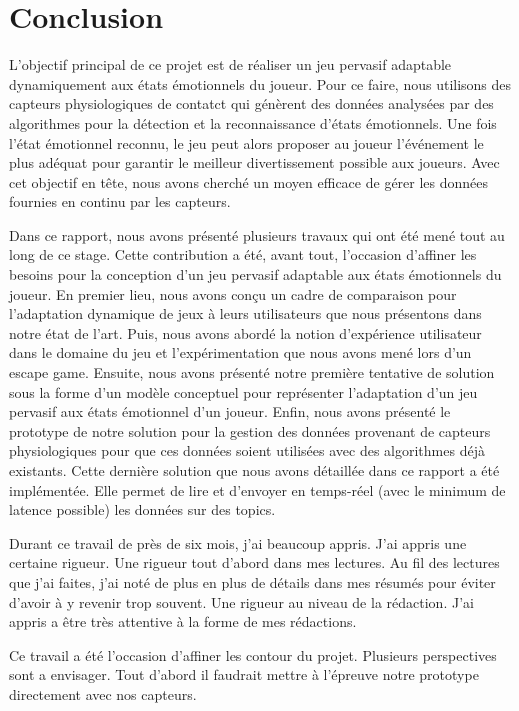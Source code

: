 \documentclass{article}
\begin{document}
\section{Conclusion}\label{sec:conclusion}
	L'objectif principal de ce projet est de réaliser un jeu pervasif adaptable dynamiquement aux états émotionnels du joueur. 
	Pour ce faire, nous utilisons des capteurs physiologiques de contatct qui génèrent des données analysées par des algorithmes pour la détection et la reconnaissance d'états émotionnels.
	Une fois l'état émotionnel reconnu, le jeu peut alors proposer au joueur l'événement le plus adéquat pour garantir le meilleur divertissement possible aux joueurs.
	Avec cet objectif en tête, nous avons cherché un moyen efficace de gérer les données fournies en continu par les capteurs.\par
	Dans ce rapport, nous avons présenté plusieurs travaux qui ont été mené tout au long de ce stage. 
	Cette contribution a été, avant tout, l'occasion d'affiner les besoins pour la conception d'un jeu pervasif adaptable aux états émotionnels du joueur.
	En premier lieu, nous avons conçu un cadre de comparaison pour l'adaptation dynamique de jeux à leurs utilisateurs que nous présentons dans notre état de l'art.
	Puis, nous avons abordé la notion d'expérience utilisateur dans le domaine du jeu et l'expérimentation que nous avons mené lors d'un escape game.
	Ensuite, nous avons présenté notre première tentative de solution sous la forme d'un modèle conceptuel pour représenter l'adaptation d'un jeu pervasif aux états émotionnel d'un joueur.
	Enfin, nous avons présenté le prototype de notre solution pour la gestion des données provenant de capteurs physiologiques pour que ces données soient utilisées avec des algorithmes déjà existants. 
	Cette dernière solution que nous avons détaillée dans ce rapport a été implémentée.
	Elle permet de lire et d'envoyer en temps-réel (avec le minimum de latence possible) les données sur des topics.\par
	Durant ce travail de près de six mois, j'ai beaucoup appris.
	J'ai appris une certaine rigueur.
	Une rigueur tout d'abord dans mes lectures.
	Au fil des lectures que j'ai faites, j'ai noté de plus en plus de détails dans mes résumés pour éviter d'avoir à y revenir trop souvent. 
	Une rigueur au niveau de la rédaction.
	J'ai appris a être très attentive à la forme de mes rédactions.\par
	Ce travail a été l'occasion d'affiner les contour du projet.
	Plusieurs perspectives sont a envisager.
	Tout d'abord il faudrait mettre à l'épreuve notre prototype directement avec nos capteurs.
\end{document}
